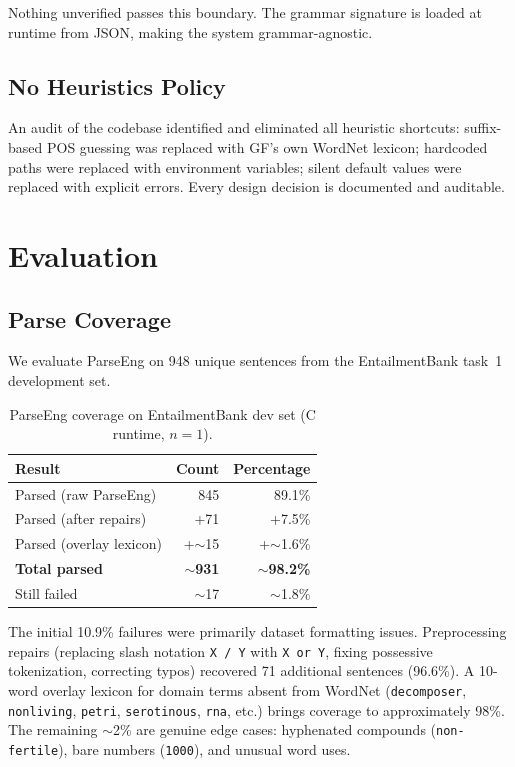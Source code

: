 \documentclass[]{article}
\newcommand{\code}[1]{\texttt{#1}}
\begin{document}
Nothing unverified passes this boundary. The grammar signature is loaded
at runtime from JSON, making the system grammar-agnostic.

\subsection{No Heuristics Policy}

An audit of the codebase identified and eliminated all heuristic shortcuts:
suffix-based POS guessing was replaced with GF's own WordNet lexicon;
hardcoded paths were replaced with environment variables; silent default
values were replaced with explicit errors. Every design decision is
documented and auditable.

\section{Evaluation}
\label{sec:evaluation}

\subsection{Parse Coverage}

We evaluate ParseEng on 948 unique sentences from the EntailmentBank
task~1 development set.

\begin{table}[h]
\centering
\begin{tabular}{lrr}
\toprule
\textbf{Result} & \textbf{Count} & \textbf{Percentage} \\
\midrule
Parsed (raw ParseEng) & 845 & 89.1\% \\
Parsed (after repairs) & +71 & +7.5\% \\
Parsed (overlay lexicon) & +$\sim$15 & +$\sim$1.6\% \\
\textbf{Total parsed} & \textbf{$\sim$931} & \textbf{$\sim$98.2\%} \\
\midrule
Still failed & $\sim$17 & $\sim$1.8\% \\
\bottomrule
\end{tabular}
\caption{ParseEng coverage on EntailmentBank dev set (C runtime, $n{=}1$).}
\label{tab:coverage}
\end{table}

The initial 10.9\% failures were primarily dataset formatting issues.
Preprocessing repairs (replacing slash notation \code{X / Y} with
\code{X or Y}, fixing possessive tokenization, correcting typos)
recovered 71 additional sentences (96.6\%). A 10-word overlay lexicon
for domain terms absent from WordNet (\code{decomposer},
\code{nonliving}, \code{petri}, \code{serotinous}, \code{rna}, etc.)
brings coverage to approximately 98\%. The remaining $\sim$2\% are
genuine edge cases: hyphenated compounds (\code{non-fertile}),
bare numbers (\code{1000}), and unusual word uses.
\end{document}
